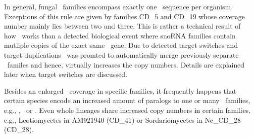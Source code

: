  In general, fungal \sno\
families encompass exactly one \sno\ sequence per organism. Exceptions
of this rule are given by families CD\_5 and CD\_19 whose coverage
number mainly lies between two and three. This is rather a technical
result of how \snostrip\ works than a detected biological event where
snoRNA families contain mutliple copies of the exact same \sno\
gene. Due to detected target switches and target duplications
\snostrip\ was promted to automatically merge previously separate
\sno\ familes and hence, virtually increases the copy numbers. Details
are explained later when target switches are discussed.

Besides an enlarged \sno\ coverage in specific families, it frequently
happens that certain species encode an increased amount of paralogs to
one or many \sno\ families, e.g., \Ppl, \Asp\ or \Nfu. Even whole
lineages share increased copy numbers in certain families, e.g.,
Leotiomycetes in AM921940 (CD\_41) or Sordariomycetes in Nc\_CD\_28
(CD\_28).

